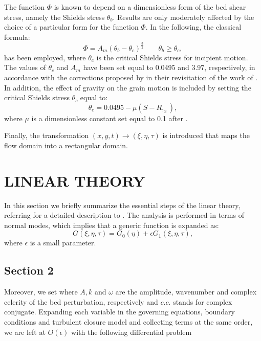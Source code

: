 \documentclass[12pt,a4paper,twocolumn,fleqn]{narms}
\begin{document}
The function $\Phi$ is known to depend on a dimensionless form of
the bed shear stress, namely the Shields stress $\theta_b$.
Results are only moderately affected by the choice of a particular
form for the function $\Phi$. In the following, the classical
 formula: \begin{equation} \Phi = A_m (\theta_b -
\theta_c)^{\frac{3}{2}} \qquad \theta_b \geq \theta_c, \label{mpm}
\end{equation} has been employed, where $\theta_c$ is the critical Shields
stress for incipient motion. The values of $\theta_c$ and $A_m$
have been set equal to 0.0495 and 3.97, respectively, in
accordance with the corrections proposed by  in their
revisitation of the work of . In addition, the effect
of gravity on the grain motion is included by setting the critical
Shields stress $\theta_c$ equal to: \begin{equation} \theta_c =
0.0495 - \mu (S - R,_x), \label{effective} \end{equation} where
$\mu$ is a dimensionless constant set equal to 0.1 after
\cite{fr74}.

Finally, the transformation $(x,y,t) \rightarrow (\xi,\eta,\tau)$ is
introduced that maps the flow domain into a rectangular domain.


\section{LINEAR THEORY}
\label{ltheory}

In this section we briefly summarize the essential steps of the linear
theory, referring for a detailed description to .  The
analysis is performed in terms of normal modes, which implies that a
generic function is expanded as:
\begin{equation}
G(\xi, \eta, \tau) = G_0(\eta) + \epsilon G_1(\xi, \eta, \tau),
\end{equation}
where $\epsilon$ is a small parameter.

\subsection{Section 2}

Moreover, we set where $A, k$ and $\omega$ are the amplitude,
wavenumber and complex celerity of the bed perturbation,
respectively and $c.c.$ stands for complex conjugate. Expanding
each variable in the governing equations, boundary conditions and
turbulent closure model and collecting terms at the same order, we
are left at $O(\epsilon)$ with the following differential problem
\end{document}
